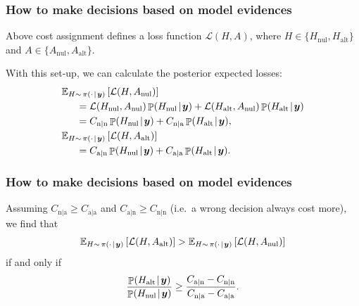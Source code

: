 \documentclass[18pt, handout]{beamer}
\newcommand{\defineTightSpacing}{%
	\setlength{\abovedisplayskip}{.25\baselineskip}%
	\setlength{\belowdisplayskip}{.25\baselineskip}%
}
\newcommand{\given}{\mskip.7\thinmuskip | \mskip.7\thinmuskip}
\DeclareMathOperator{\probability}{\mathbb{P}}
\newcommand{\expectation}{\mathbb{E}}
\newcommand{\density}{\operatorname{\pi}}
\newcommand{\by}{\bm{y}}
\newcommand{\hypothesis}{H}
\renewcommand{\action}{A}
\newcommand{\loss}{\mathcal{L}}
\newcommand{\nullSub}{\mathrm{nul}}
\newcommand{\altSub}{\mathrm{alt}}
\begin{document}
\begin{frame}
\frametitle{How to make decisions based on model evidences}
Above cost assignment defines a loss function $\loss(\hypothesis, \action)$, where $\hypothesis \in \{ \hypothesis_\nullSub, \hypothesis_\altSub \}$ and $\action \in \{ \action_\nullSub, \action_\altSub \}$. 

With this set-up, we can calculate the posterior expected losses:
\begin{equation*} \defineTightSpacing%
\begin{aligned}
&\expectation_{\hypothesis \sim \, \density(\cdot \given \by)} \left[
	\loss(\hypothesis, \action_\nullSub)
\right] \\
	&\hspace*{1.5em}= \loss(\hypothesis_\nullSub, \action_\nullSub) \probability(\hypothesis_\nullSub \given \by)
		+ \loss(\hypothesis_\altSub, \action_\nullSub) \probability(\hypothesis_\altSub \given \by) \\
	&\hspace*{1.5em}= C_{\mathrm{n | n}} \probability(\hypothesis_\nullSub \given \by)
		+ C_{\mathrm{n | a}} \probability(\hypothesis_\altSub \given \by), \\
&\expectation_{\hypothesis \sim \, \density(\cdot \given \by)} \left[
	\loss(\hypothesis, \action_\altSub)
\right] \\
	&\hspace*{1.5em}= C_{\mathrm{a | n}} \probability(\hypothesis_\nullSub \given \by)
		+ C_{\mathrm{a | a}} \probability(\hypothesis_\altSub \given \by).
\end{aligned}
\end{equation*}
\end{frame}


\begin{frame}
\frametitle{How to make decisions based on model evidences}
Assuming $C_{\mathrm{n | a}} \geq C_{\mathrm{a | a}}$ and $C_{\mathrm{a | n}} \geq C_{\mathrm{n | n}}$ (i.e.\ a wrong decision always cost more), we find that
\begin{equation*} \defineTightSpacing%
\expectation_{\hypothesis \sim \, \density(\cdot \given \by)} \left[
	\loss(\hypothesis, \action_\altSub)
\right]
	> 
\expectation_{\hypothesis \sim \, \density(\cdot \given \by)} \left[
	\loss(\hypothesis, \action_\nullSub)
\right] 
\end{equation*}
if and only if
\begin{equation*} \defineTightSpacing%
\frac{
	\probability(\hypothesis_\altSub \given \by) 
}{
	\probability(\hypothesis_\nullSub \given \by)
} \geq
	\frac{
		C_{\mathrm{a | n}} - C_{\mathrm{n | n}}
	}{
		C_{\mathrm{n | a}} - C_{\mathrm{a | a}}
	}.
\end{equation*}
\end{frame}
\end{document}
